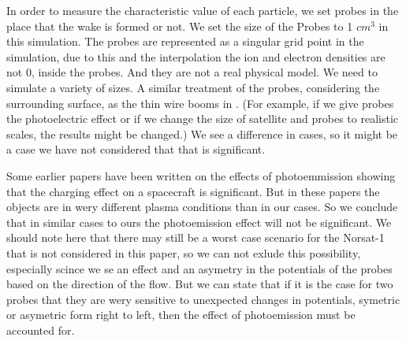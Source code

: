 In order to measure the characteristic value of each particle, we set probes in the
place that the wake is formed or not.
We set the size of the Probes to 1 $cm^3$ in this simulation. The probes are represented as a singular
grid point in the simulation, due to this and the interpolation the ion and electron densities
are not \(0\), inside the probes. And they are not a real
physical model. We need to simulate a variety of sizes. A similar treatment of the probes, considering the surrounding surface,
as the thin wire booms in \citet{miyake_plasma_2013}.
(For example, if we give probes the photoelectric effect or if we change the size of satellite and
probes to realistic scales, the results might be changed.)
We see a difference in cases, so it might be a case we have not considered that that is significant.

Some earlier papers have been written on the effects of photoemmission showing that the charging effect
on a spacecraft is significant.\citep{ergun_spacecraft_2010} But in these papers the objects are in wery different
plasma conditions than in our cases. So we conclude that in similar cases to ours the photoemission effect
will not be significant. We should note here that there may still be a worst case scenario for the Norsat-1
that is not considered in this paper, so we can not exlude this possibility, especially scince we se an effect and an
asymetry in the potentials of the probes based on the direction of the flow. But we can state that if
it is the case for two probes that they are wery sensitive to unexpected changes in potentials, symetric or asymetric form
right to left, then the effect of photoemission must be accounted for.
